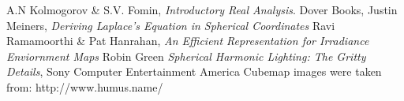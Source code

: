 \documentclass{article}
\theoremstyle{definition}
\theoremstyle{definition}
\begin{document}
\pagebreak

\begin{thebibliography}{999}

  A.N Kolmogorov \& S.V. Fomin,
  \emph{Introductory Real Analysis}.
  Dover Books,
    Justin Meiners,
   \emph{Deriving Laplace's Equation in Spherical Coordinates}
    Ravi Ramamoorthi \& Pat Hanrahan,
    \emph{An Efficient Representation for Irradiance Enviornment Maps}
    Robin Green
    \emph{Spherical Harmonic Lighting: The Gritty Details},
    Sony Computer Entertainment America
    Cubemap images were taken from: http://www.humus.name/

\end{thebibliography}
\end{document}
